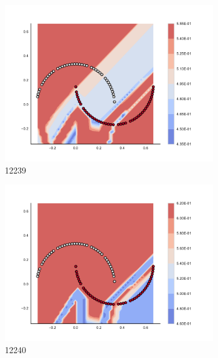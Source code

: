 \begin{figure}[h]
\begin{subfigure}[b]{0.09\textwidth}
    \includegraphics[clip, trim=2.35cm 1.75cm 4.5cm 0cm,width=\textwidth]{img/convergence/12239.pdf}
    \caption{12239}
    \label{fig:convergence_12239}
\end{subfigure}
%
\begin{subfigure}[b]{0.09\textwidth}
    \includegraphics[clip, trim=2.35cm 1.75cm 4.5cm 0cm,width=\textwidth]{img/convergence/12240.pdf}
    \caption{12240}
    \label{fig:convergence_12240}
\end{subfigure}
%
\begin{subfigure}[b]{0.09\textwidth}

\end{subfigure}
\end{figure}

